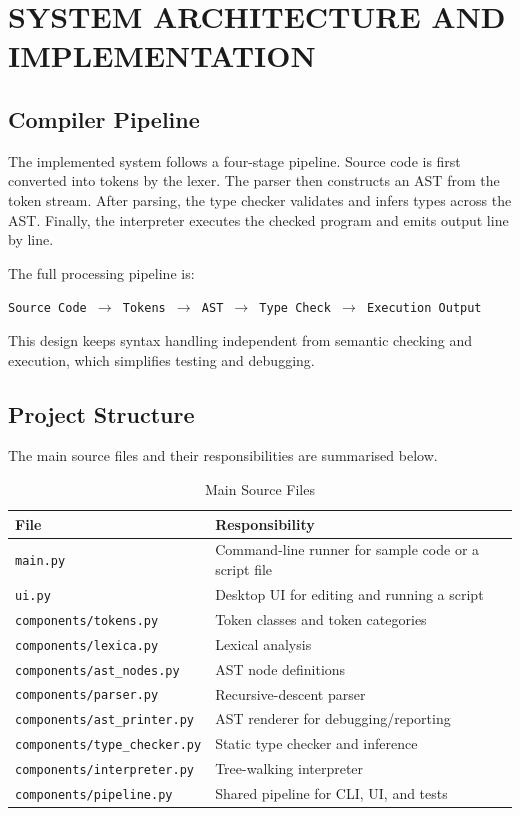 \chapter{SYSTEM ARCHITECTURE AND IMPLEMENTATION}

\section{Compiler Pipeline}
The implemented system follows a four-stage pipeline. Source code is first
converted into tokens by the lexer. The parser then constructs an AST from the
token stream. After parsing, the type checker validates and infers types across
the AST. Finally, the interpreter executes the checked program and emits output
line by line.

The full processing pipeline is:

\begin{center}
\texttt{Source Code $\rightarrow$ Tokens $\rightarrow$ AST $\rightarrow$ Type Check $\rightarrow$ Execution Output}
\end{center}

This design keeps syntax handling independent from semantic checking and
execution, which simplifies testing and debugging.

\section{Project Structure}
The main source files and their responsibilities are summarised below.

\begin{table}[H]
\centering
\caption{Main Source Files}
\begin{tabular}{ll}
\toprule
File & Responsibility \\
\midrule
\texttt{main.py} & Command-line runner for sample code or a script file \\
\texttt{ui.py} & Desktop UI for editing and running a script \\
\texttt{components/tokens.py} & Token classes and token categories \\
\texttt{components/lexica.py} & Lexical analysis \\
\texttt{components/ast\_nodes.py} & AST node definitions \\
\texttt{components/parser.py} & Recursive-descent parser \\
\texttt{components/ast\_printer.py} & AST renderer for debugging/reporting \\
\texttt{components/type\_checker.py} & Static type checker and inference \\
\texttt{components/interpreter.py} & Tree-walking interpreter \\
\texttt{components/pipeline.py} & Shared pipeline for CLI, UI, and tests \\
\bottomrule
\end{tabular}
\end{table}

